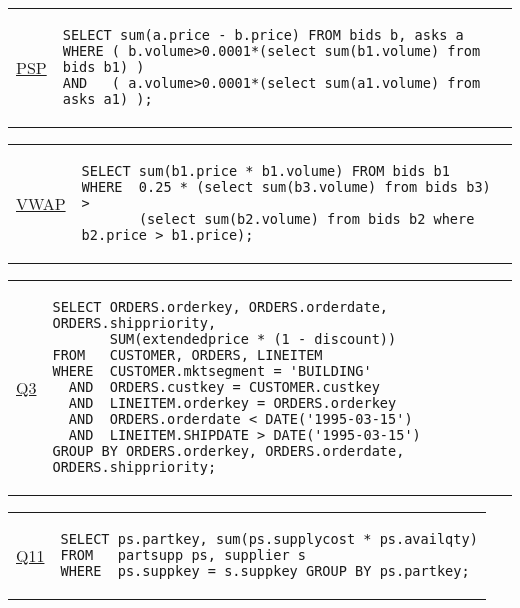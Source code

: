 \hspace{-5mm}\vspace{-8mm}
\begin{tabular}{lp{}}
\begin{rotate}{90}\hspace{-0.95cm}\underline{{\scriptsize PSP}}\end{rotate} &
{\scriptsize
\begin{verbatim}
SELECT sum(a.price - b.price) FROM bids b, asks a
WHERE ( b.volume>0.0001*(select sum(b1.volume) from bids b1) )
AND   ( a.volume>0.0001*(select sum(a1.volume) from asks a1) );
\end{verbatim}
}
\end{tabular}

\hspace{-5mm}\vspace{-8mm}
\begin{tabular}{lp{}}
\begin{rotate}{90}\hspace{-1.15cm}\underline{{\scriptsize VWAP}}\end{rotate} &
{\scriptsize
\begin{verbatim}
SELECT sum(b1.price * b1.volume) FROM bids b1
WHERE  0.25 * (select sum(b3.volume) from bids b3) >
       (select sum(b2.volume) from bids b2 where b2.price > b1.price);
\end{verbatim}
}
\end{tabular}

\hspace{-5mm}\vspace{-8mm}
\begin{tabular}{lp{}}
\begin{rotate}{90}\hspace{-0.75cm}\underline{{\scriptsize Q3}}\end{rotate} &
{\scriptsize
\begin{verbatim}
SELECT ORDERS.orderkey, ORDERS.orderdate, ORDERS.shippriority,
       SUM(extendedprice * (1 - discount))
FROM   CUSTOMER, ORDERS, LINEITEM
WHERE  CUSTOMER.mktsegment = 'BUILDING'
  AND  ORDERS.custkey = CUSTOMER.custkey
  AND  LINEITEM.orderkey = ORDERS.orderkey
  AND  ORDERS.orderdate < DATE('1995-03-15')
  AND  LINEITEM.SHIPDATE > DATE('1995-03-15')
GROUP BY ORDERS.orderkey, ORDERS.orderdate, ORDERS.shippriority;
\end{verbatim}}
\end{tabular}

\hspace{-5mm}\vspace{-8mm}
\begin{tabular}{lp{}}
\begin{rotate}{90}\hspace{-0.9cm}\underline{{\scriptsize Q11}}\end{rotate} &
{\scriptsize
\begin{verbatim}
SELECT ps.partkey, sum(ps.supplycost * ps.availqty)
FROM   partsupp ps, supplier s
WHERE  ps.suppkey = s.suppkey GROUP BY ps.partkey;
\end{verbatim}}
\end{tabular}

